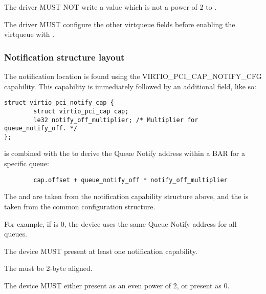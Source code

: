 The driver MUST NOT write a value which is not a power of 2 to .

The driver MUST configure the other virtqueue fields before enabling the virtqueue
with .

\subsubsection{Notification structure layout}\label{sec:Virtio Transport Options / Virtio Over PCI Bus / PCI Device Layout / Notification capability}

The notification location is found using the VIRTIO_PCI_CAP_NOTIFY_CFG
capability.  This capability is immediately followed by an additional
field, like so:

\begin{lstlisting}
struct virtio_pci_notify_cap {
        struct virtio_pci_cap cap;
        le32 notify_off_multiplier; /* Multiplier for queue_notify_off. */
};
\end{lstlisting}

 is combined with the  to
derive the Queue Notify address within a BAR for a specific queue:

\begin{lstlisting}
        cap.offset + queue_notify_off * notify_off_multiplier
\end{lstlisting}

The  and  are taken from the
notification capability structure above, and the  is
taken from the common configuration structure.

\begin{note}
For example, if  is 0, the device uses
the same Queue Notify address for all queues.
\end{note}

The device MUST present at least one notification capability.

The  must be 2-byte aligned.  

The device MUST either present  as an even power of 2,
or present  as 0.

